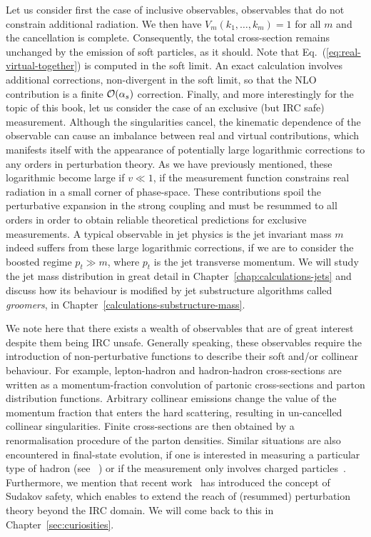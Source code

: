 Let us consider first the case of inclusive observables, \ie observables
that do not constrain additional radiation. We then have
$V_m\left(k_1,\ldots,k_m\right)=1$ for all $m$ and the cancellation is
complete. Consequently, the total cross-section remains unchanged by
the emission of soft particles, as it should. 
Note that
  Eq.~(\ref{eq:real-virtual-together}) is computed in the soft
  limit. An exact calculation involves additional corrections,
  non-divergent in the soft limit, so that the NLO contribution is a
  finite ${\cal{O}}(\alpha_s)$ correction.
%
Finally, and more interestingly for the topic of this book, let us consider the case of an exclusive (but IRC safe) measurement. Although the singularities cancel, the kinematic dependence of the observable can cause an imbalance between real and virtual contributions, which manifests itself with the appearance of potentially large logarithmic corrections to any orders in perturbation theory.
%
As we have previously mentioned, these logarithmic become large if
$v\ll 1$, \ie if the measurement function constrains real
radiation in a small corner of phase-space.
%
These contributions spoil
the perturbative expansion in the strong coupling and must be resummed
to all orders in order to obtain reliable theoretical predictions for
exclusive measurements. A typical observable in jet physics
is the jet invariant mass $m$ indeed suffers from these large
logarithmic corrections, if we are to consider the boosted regime
$p_t\gg m$, where $p_t$ is the jet transverse momentum. We will study
the jet mass distribution in great detail in
Chapter~\ref{chap:calculations-jets} and discuss how its behaviour is
modified by jet substructure algorithms called \emph{groomers}, in
Chapter~\ref{calculations-substructure-mass}.


We note here that there exists a wealth of observables that are of great interest despite them being IRC unsafe. Generally speaking, these observables require the introduction of non-perturbative functions to describe their soft and/or collinear behaviour. For example, lepton-hadron and hadron-hadron cross-sections are written as a momentum-fraction convolution of partonic cross-sections and parton distribution functions. Arbitrary collinear emissions change the value of the momentum fraction that enters the hard scattering, resulting in un-cancelled collinear singularities. Finite cross-sections are then obtained by a renormalisation procedure of the parton densities.  Similar situations are also encountered in final-state evolution, if one is interested in measuring a particular type of hadron (see \eg~\cite{Collins:1987pm}) or if the measurement only involves charged particles~\cite{Chang:2013rca,Chang:2013iba}.
%
Furthermore, we mention that recent work~\cite{Larkoski:2013paa, Larkoski:2014wba,Larkoski:2015lea} has introduced the concept of Sudakov safety, which enables to extend the reach of (resummed) perturbation theory beyond the IRC domain. We will come back to this in Chapter~\ref{sec:curiosities}.



